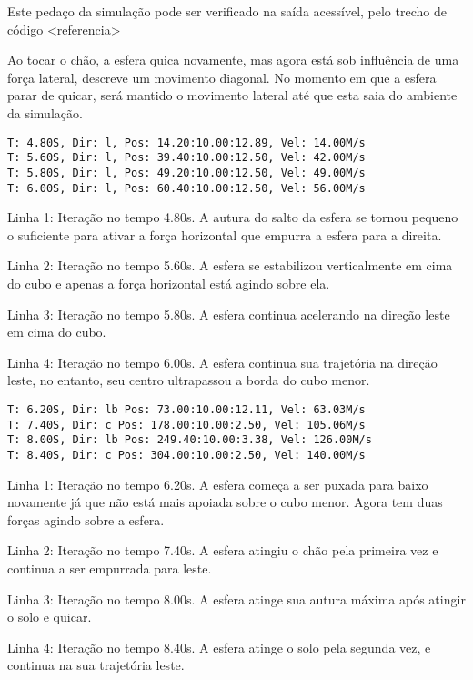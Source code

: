 \documentclass[12pt]{article}
\begin{document}
Este pedaço da simulação pode ser verificado na saída acessível, pelo trecho de código <referencia> 

Ao tocar o chão, a esfera quica novamente, mas agora está sob influência de uma força lateral, descreve um movimento diagonal. No momento em que a esfera parar de quicar, será mantido o movimento lateral até que esta saia do ambiente da simulação.

\begin{lstlisting}[frame=single,caption=Esfera sobre o cubo menor\label{lg:esfera_m2}]
T: 4.80S, Dir: l, Pos: 14.20:10.00:12.89, Vel: 14.00M/s
T: 5.60S, Dir: l, Pos: 39.40:10.00:12.50, Vel: 42.00M/s
T: 5.80S, Dir: l, Pos: 49.20:10.00:12.50, Vel: 49.00M/s
T: 6.00S, Dir: l, Pos: 60.40:10.00:12.50, Vel: 56.00M/s
\end{lstlisting}

Linha 1: Iteração no tempo 4.80s. A autura do salto da esfera se tornou pequeno o suficiente para ativar a força horizontal que empurra a esfera para a direita.

Linha 2: Iteração no tempo 5.60s. A esfera se estabilizou verticalmente em cima do cubo e apenas a força horizontal está agindo sobre ela.

Linha 3: Iteração no tempo 5.80s. A esfera continua acelerando  na direção leste em cima do cubo.

Linha 4: Iteração no tempo 6.00s. A esfera continua sua trajetória na direção leste, no entanto, seu centro ultrapassou a borda do cubo menor.

\begin{lstlisting}[frame=single,caption=Esfera se movendo diagonalmente\label{lg:esfera_m3}]
T: 6.20S, Dir: lb Pos: 73.00:10.00:12.11, Vel: 63.03M/s
T: 7.40S, Dir: c Pos: 178.00:10.00:2.50, Vel: 105.06M/s
T: 8.00S, Dir: lb Pos: 249.40:10.00:3.38, Vel: 126.00M/s
T: 8.40S, Dir: c Pos: 304.00:10.00:2.50, Vel: 140.00M/s
\end{lstlisting}

Linha 1: Iteração no tempo 6.20s. A esfera começa a ser puxada para baixo novamente já que não está mais apoiada sobre o cubo menor. Agora tem duas forças agindo sobre a esfera.

Linha 2: Iteração no tempo 7.40s. A esfera atingiu o chão pela primeira vez e continua a ser empurrada para leste.

Linha 3: Iteração no tempo 8.00s. A esfera atinge sua autura máxima após atingir o solo e quicar.

Linha 4: Iteração no tempo 8.40s. A esfera atinge o solo pela segunda vez, e continua na sua trajetória leste.
\end{document}
